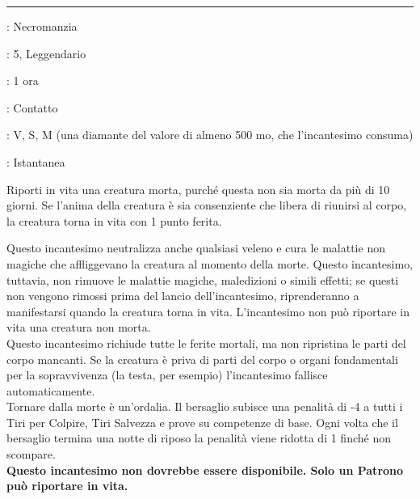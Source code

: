\documentclass[a4paper,twoside,openany]{book}
\begin{document}
\begin{multicols}{2}
\smallskip\noindent\rule{\linewidth}{2pt} \hypertarget{Rianimare Morti}{}\medskip{}
\noindent
\begin{description}[noitemsep, topsep=0pt, parsep=0pt, partopsep=0pt, leftmargin=0cm, labelwidth=2.8cm]
	\item[\textbf{Lista di Magia}]: Necromanzia
	\item[\textbf{Livello}]: 5, Leggendario
	\item[\textbf{Tempo di Lancio}]: 1 ora
	\item[\textbf{Gittata}]: Contatto
	\item[\textbf{Componenti}]: V, S, M (una diamante del valore di almeno 500 mo, che l'incantesimo consuma)
	\item[\textbf{Durata}]: Istantanea
\end{description}

Riporti in vita una creatura morta, purché questa non sia morta da più di 10 giorni. Se l'anima della creatura è sia consenziente che libera di riunirsi al corpo, la creatura torna in vita con 1 punto ferita.

Questo incantesimo neutralizza anche qualsiasi veleno e cura le malattie non magiche che affliggevano la creatura al momento della morte. Questo incantesimo, tuttavia, non rimuove le malattie magiche, maledizioni o simili effetti; se questi non vengono rimossi prima del lancio dell'incantesimo, riprenderanno a manifestarsi quando la creatura torna in vita. L'incantesimo non può riportare in vita una creatura non morta.\\
Questo incantesimo richiude tutte le ferite mortali, ma non ripristina le parti del corpo mancanti. Se la creatura è priva di parti del corpo o organi fondamentali per la sopravvivenza (la testa, per esempio) l'incantesimo fallisce automaticamente.\\
Tornare dalla morte è un'ordalia. Il bersaglio subisce una penalità di -4 a tutti i Tiri per Colpire, Tiri Salvezza e prove su competenze di base. Ogni volta che il bersaglio termina una notte di riposo la penalità viene ridotta di 1 finché non scompare.\\
\textbf{Questo incantesimo non dovrebbe essere disponibile. Solo un Patrono può riportare in vita.}


\end{multicols}
\end{document}
